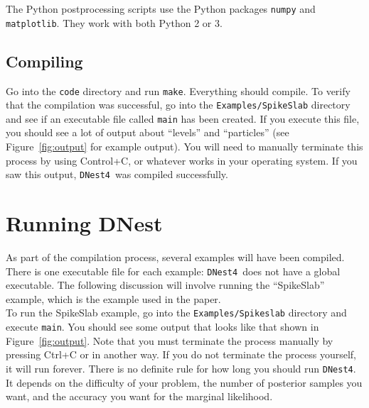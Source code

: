\documentclass[a4paper, 11pt]{article}
\newcommand{\dnest}{{\tt DNest4}}
\begin{document}
The Python postprocessing scripts use the Python packages
{\tt numpy} and {\tt matplotlib}. They work with both Python 2 or 3.

\subsection{Compiling}
Go into the {\tt code} directory and run {\tt make}. Everything should compile.
To
verify that the compilation was successful,
go into the {\tt Examples/SpikeSlab} directory
and see if an executable file called {\tt main} has been created. If you
execute this file, you should see a lot of output about ``levels'' and
``particles'' (see Figure~\ref{fig:output} for example output).
You will need to manually terminate this process by using
Control+C, or whatever works in your operating system. If you saw this output,
\dnest~was compiled successfully.\\

\section{Running DNest}
As part of the compilation process, several examples will have been compiled.
There is one executable file for each example: \dnest~does not have a global
executable. The
following discussion will involve running the ``SpikeSlab'' example, which is
the example used in the paper.\\

To run the SpikeSlab example, go into the {\tt Examples/Spikeslab}
directory and execute {\tt main}. You should see some output that looks like
that shown in Figure~\ref{fig:output}.
Note that you must terminate the process manually by pressing Ctrl+C
or in another way. If you do not terminate the process yourself, it will run
forever. There is no definite rule for how long you should run \dnest.
It depends on the difficulty of your problem, the number of posterior samples you
want, and the accuracy you want for the marginal likelihood.\\
\end{document}
